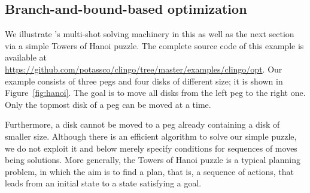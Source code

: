 
\subsection{Branch-and-bound-based optimization}
\label{sec:optimization}

We illustrate \clingo's multi-shot solving machinery in this as well as the next section via a simple Towers of Hanoi puzzle.
The complete source code of this example is available at \url{https://github.com/potassco/clingo/tree/master/examples/clingo/opt}.
Our example consists of three pegs and four disks of different size; it is shown in Figure~\ref{fig:hanoi}.
The goal is to move all disks from the left peg to the right one.
Only the topmost disk of a peg can be moved at a time.

Furthermore,
a disk cannot be moved to a peg already containing a disk of smaller size.
Although there is an efficient algorithm to solve our simple puzzle,
we do not exploit it and below merely specify conditions for
sequences of moves being solutions.
%
More generally,
the Towers of Hanoi puzzle is a typical planning problem,
in which the aim is to find a plan, that is, a sequence of actions, that leads from an initial state to a state satisfying a goal.

